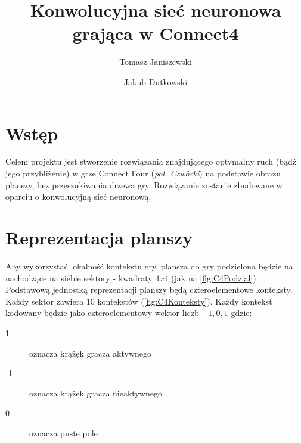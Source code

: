 \documentclass{llncs}
\begin{document}
\title{Konwolucyjna sieć neuronowa grająca w Connect4}
%
%
\author{Tomasz Janiszewski \and Jakub Dutkowski}
%
%


\maketitle              %

%
\section{Wstęp}
Celem projektu jest stworzenie rozwiązania znajdującego optymalny ruch (bądź jego przybliżenie) w grze Connect Four (\emph{pol. Czwórki}) \cite{connect4:wiki} na podstawie obrazu planszy, bez przeszukiwania drzewa gry. 
Rozwiązanie zostanie zbudowane w oparciu o konwolucyjną sieć neuronową.

\section{Reprezentacja planszy}
Aby wykorzystać lokalność kontekstu gry, plansza do gry podzielona będzie na nachodzące na siebie sektory - kwadraty $4x4$ (jak na \autoref{fig:C4Podzial}). Podstawową jednostką reprezentacji planszy będą czteroelementowe konteksty. Każdy sektor zawiera 10 kontekstów (\autoref{fig:C4Konteksty}). 
Każdy kontekst kodowany będzie jako czteroelementowy wektor liczb ${-1, 0, 1}$ gdzie:
\begin{description}
	\item[1] oznacza krążęk gracza aktywnego
	\item[-1] oznacza krążek gracza nieaktywnego
	\item[0] oznacza puste pole
\end{description} 
\end{document}
